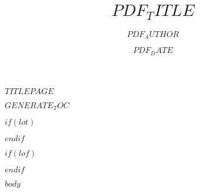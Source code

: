 \documentclass[
$FONT_SIZE$,
$if(lang)$
  $babel-lang$,
$endif$
]{scrartcl}
\date{$PDF_DATE$}
\title{$PDF_TITLE$}
\author{$PDF_AUTHOR$}
\begin{document}
$TITLEPAGE$

$GENERATE_TOC$

$if(lot)$
\listoftables
$endif$

$if(lof)$
\listoffigures
$endif$

$body$
\end{document}
